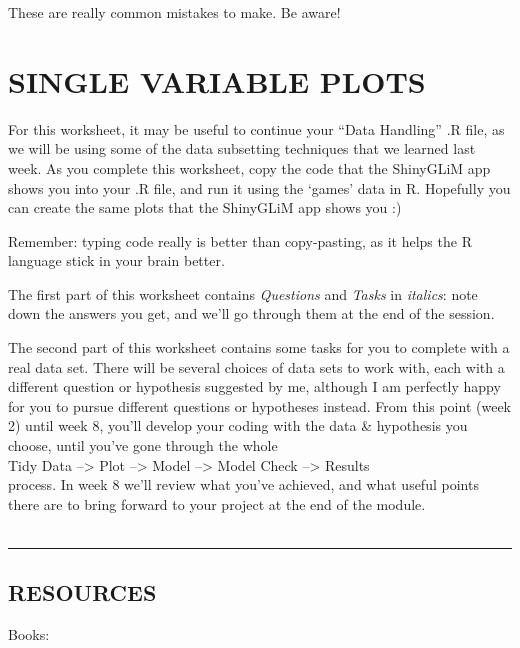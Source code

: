 \documentclass[
]{book}
\begin{document}
These are really common mistakes to make. Be aware!

\hypertarget{single-variable-plots}{%
\chapter{SINGLE VARIABLE PLOTS}\label{single-variable-plots}}

For this worksheet, it may be useful to continue your ``Data Handling'' .R file,
as we will be using some of the data subsetting techniques that we learned
last week. As you complete this worksheet, copy the code that the ShinyGLiM
app shows you into your .R file, and run it using the `games' data in R. Hopefully
you can create the same plots that the ShinyGLiM app shows you :)

Remember: typing code really is better than copy-pasting, as it helps the R language stick in your
brain better.

The first part of this worksheet contains \emph{Questions} and \emph{Tasks} in \emph{italics}: note
down the answers you get, and we'll go through them at the end of the session.

The second part of this worksheet contains some tasks for you to complete with a
real data set. There will be several choices of data sets to work with, each with a different
question or hypothesis suggested by me, although I am perfectly happy for
you to pursue different questions or hypotheses instead.
From this point (week 2) until week 8, you'll develop
your coding with the data \& hypothesis you choose, until you've gone through the whole\\
Tidy Data --\textgreater{} Plot --\textgreater{} Model --\textgreater{} Model Check --\textgreater{} Results\\
process. In week 8 we'll review what you've achieved, and what useful points there
are to bring forward to your project at the end of the module.\\
~\\

\begin{center}\rule{0.5\linewidth}{\linethickness}\end{center}

\hypertarget{resources}{%
\section{RESOURCES}\label{resources}}

Books:
\end{document}
